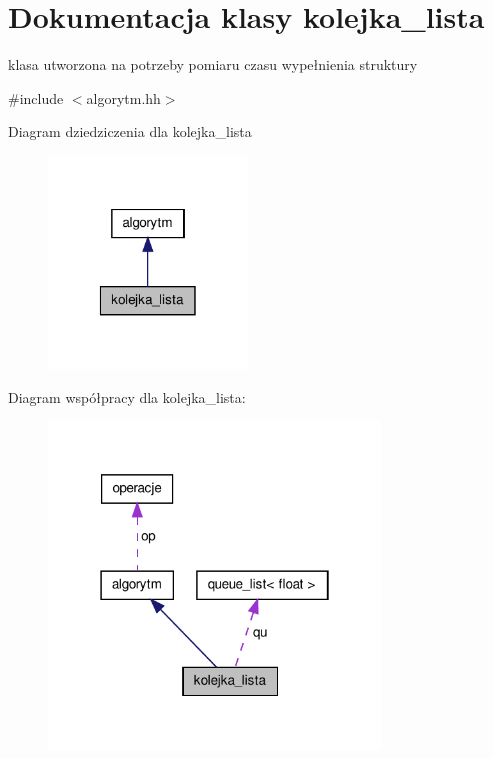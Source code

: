 \hypertarget{classkolejka__lista}{\section{\-Dokumentacja klasy kolejka\-\_\-lista}
\label{classkolejka__lista}
}


klasa utworzona na potrzeby pomiaru czasu wypełnienia struktury  




{\ttfamily \#include $<$algorytm.\-hh$>$}



\-Diagram dziedziczenia dla kolejka\-\_\-lista
\nopagebreak
\begin{figure}[H]
\begin{center}
\leavevmode
\includegraphics[width=150pt]{classkolejka__lista__inherit__graph}
\end{center}
\end{figure}


\-Diagram współpracy dla kolejka\-\_\-lista\-:
\nopagebreak
\begin{figure}[H]
\begin{center}
\leavevmode
\includegraphics[width=250pt]{classkolejka__lista__coll__graph}
\end{center}
\end{figure}
